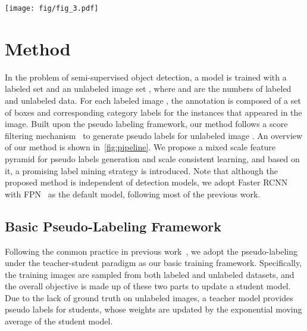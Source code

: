 \documentclass[10pt,twocolumn,letterpaper]{article}
\begin{document}
\begin{figure*}[t]
	\centering
	\texttt{[image: fig/fig\_3.pdf]}
    \vspace{-.5em}
	\caption{During training, the model first constructs two feature pyramids for a regular scale and a down-sampled scale with a feature extraction module , respectively. Next, an additional mixed scale feature pyramid is built by a feature fusion module . The student model trains on three scales with a shared detection head  taking the pseudo boxes generated from the mixed-scale of teacher model as supervisions. In addition, promising labels with low confidence scores are mined with a PLM strategy. The weights  in teacher are updated by EMA of the weights  in student. 
 In testing, the model with original architecture and 
 regular input scale is used.
 }
	\vspace{-.5em}
	\label{fig:pipeline}
\end{figure*}
\section{Method}








In the problem of semi-supervised object detection, a model is trained with a labeled set  and an unlabeled image set , where  and  are the numbers of labeled and unlabeled data.
For each labeled image , the annotation  is composed of a set of boxes and corresponding category labels for the instances that appeared in the image. Built upon the pseudo labeling framework, our method follows a score filtering mechanism~\cite{softTeacher} to generate pseudo labels  for unlabeled image . An overview of our method is shown in~\cref{fig:pipeline}. We propose a mixed scale feature pyramid for pseudo labels generation and scale consistent learning, and based on it, a promising label mining strategy is introduced. Note that although the proposed method is independent of detection models, we adopt Faster RCNN~\cite{faster} with FPN~\cite{fpn} as the default model, following most of the previous work.



\subsection{Basic Pseudo-Labeling Framework}
\label{sec:basic_framwork}
Following the common practice in previous work~\cite{softTeacher, unbiasedTeacher, pseco}, we adopt the pseudo-labeling under the teacher-student paradigm as our basic training framework. Specifically, the training images are sampled from both labeled and unlabeled datasets, and the overall objective is made up of these two parts to update a student model. Due to the lack of ground truth on unlabeled images, a teacher model provides pseudo labels for students, whose weights are updated by the exponential moving average of the student model.
\end{document}
